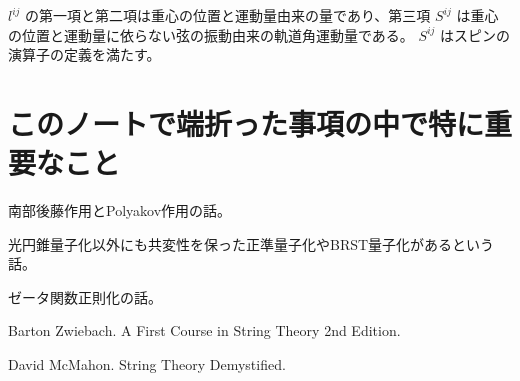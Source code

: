 \documentclass[uplatex]{jsarticle}
\begin{document}
$l^{ij}$
の第一項と第二項は重心の位置と運動量由来の量であり、第三項
$S^{ij}$
は重心の位置と運動量に依らない弦の振動由来の軌道角運動量である。
$S^{ij}$
はスピンの演算子の定義を満たす。

\section{このノートで端折った事項の中で特に重要なこと}

南部後藤作用とPolyakov作用の話。

光円錐量子化以外にも共変性を保った正準量子化やBRST量子化があるという話。

ゼータ関数正則化の話。


\begin{thebibliography}{9}

	Barton Zwiebach.
	\newblock A First Course in String Theory 2nd Edition.

	David McMahon.
	\newblock String Theory Demystified.

\end{thebibliography}
\end{document}
